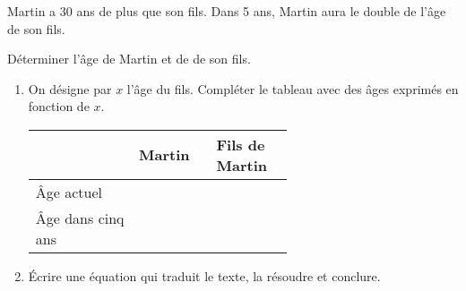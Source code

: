 \begin{exercice*}
    Martin a 30 ans de plus que son fils. Dans 5 ans, Martin aura le double de l'âge de son fils.

    Déterminer l'âge de Martin et de de son fils.
    \begin{enumerate}
        \item On désigne par $x$ l'âge du fils. Compléter le tableau avec des âges exprimés en fonction de $x$.
        
        \smallskip
        {\renewcommand{\arraystretch}{1.2}
        \begin{tabular}{|l|*{2}{>{\centering\arraybackslash}m{0.3\linewidth}|}}
            \cline{2-3}
            \multicolumn{1}{l|}{}&\cellcolor{LightGray}Martin&\cellcolor{LightGray}Fils de Martin\\\hline
            \cellcolor{LightGray}Âge actuel         &  &  \\\hline
            \cellcolor{LightGray}Âge dans cinq ans  &  &  \\\hline
        \end{tabular}
        }
        \smallskip
        \item Écrire une équation qui traduit le texte, la résoudre et conclure.
    \end{enumerate}
\end{exercice*}
